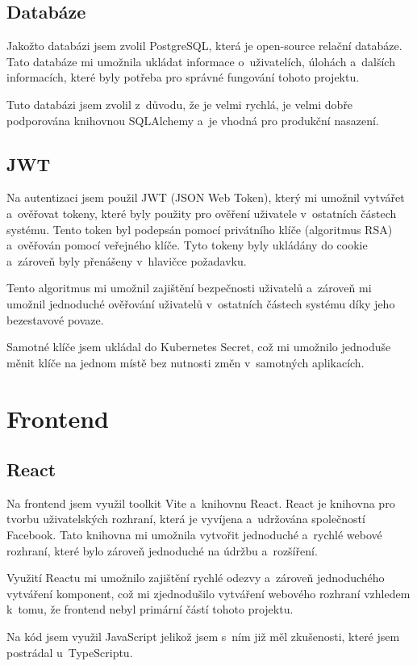 \documentclass[12pt, a4paper,
oneside,      %
openright
]{report}
\begin{document}
\subsection{Databáze}
Jakožto databázi jsem zvolil PostgreSQL, která je open-source relační databáze. Tato databáze mi umožnila ukládat informace o~uživatelích, úlohách a~dalších informacích, které byly potřeba pro správné fungování tohoto projektu. 

Tuto databázi jsem zvolil z~důvodu, že je velmi rychlá, je velmi dobře podporována knihovnou SQLAlchemy a~je vhodná pro produkční nasazení.

\subsection{JWT}
Na autentizaci jsem použil JWT (JSON Web Token), který mi umožnil vytvářet a~ověřovat tokeny, které byly použity pro ověření uživatele v~ostatních částech systému. Tento token byl podepsán pomocí privátního klíče (algoritmus RSA) a~ověřován pomocí veřejného klíče. Tyto tokeny byly ukládány do cookie a~zároveň byly přenášeny v~hlavičce požadavku.

Tento algoritmus mi umožnil zajištění bezpečnosti uživatelů a~zároveň mi umožnil jednoduché ověřování uživatelů v~ostatních částech systému díky jeho bezestavové povaze.

Samotné klíče jsem ukládal do Kubernetes Secret, což mi umožnilo jednoduše měnit klíče na jednom místě bez nutnosti změn v~samotných aplikacích.


\section{Frontend}
\subsection{React}
Na frontend jsem využil toolkit Vite a~knihovnu React. React je knihovna pro tvorbu uživatelských rozhraní, která je vyvíjena a~udržována společností Facebook. Tato knihovna mi umožnila vytvořit jednoduché a~rychlé webové rozhraní, které bylo zároveň jednoduché na údržbu a~rozšíření.

Využití Reactu mi umožnilo zajištění rychlé odezvy a~zároveň jednoduchého vytváření komponent, což mi zjednodušilo vytváření webového rozhraní vzhledem k~tomu, že frontend nebyl primární částí tohoto projektu.

Na kód jsem využil JavaScript jelikož jsem s~ním již měl zkušenosti, které jsem postrádal u~TypeScriptu.
\end{document}
